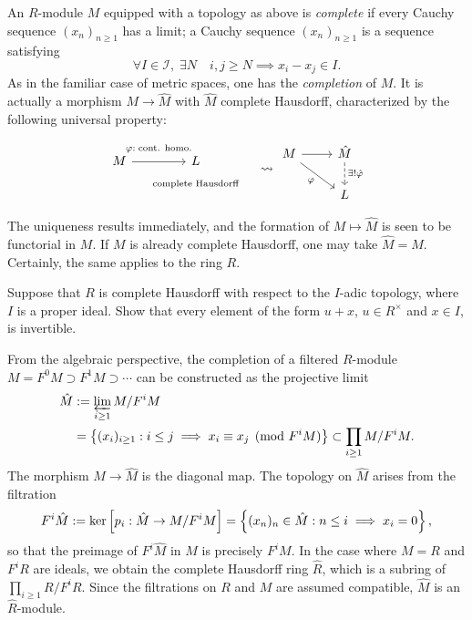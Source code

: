 An $R$-module $M$ equipped with a topology as above is \emph{complete} if every Cauchy sequence $(x_n)_{n \geq 1}$ has a limit; a Cauchy sequence $(x_n)_{n \geq 1}$ is a sequence satisfying
\[ \forall I \in \mathcal{I}, \; \exists N \quad i,j \geq N \implies x_i - x_j \in I. \]
As in the familiar case of metric spaces, one has the \emph{completion} of $M$. It is actually a morphism $M \to \hat{M}$ with $\hat{M}$ complete Hausdorff, characterized by the following universal property:
\[
\begin{tikzcd}[row sep=tiny, column sep=tiny]
	M \arrow[rr, "\varphi:\; \text{cont. homo.}" inner sep=0.7em] & & L \\
	& & \scriptsize\text{complete Hausdorff}
\end{tikzcd} \quad \leadsto
\begin{tikzcd}
	M \arrow[rd, "\varphi"'] \arrow[r] & \hat{M} \arrow[dashed, d, "\exists! \hat{\varphi}"] \\
	& L
\end{tikzcd}\]

The uniqueness results immediately, and the formation of $M \mapsto \hat{M}$ is seen to be functorial in $M$. If $M$ is already complete Hausdorff, one may take $\hat{M} = M$. Certainly, the same applies to the ring $R$.

\begin{exercise}
	Suppose that $R$ is complete Hausdorff with respect to the $I$-adic topology, where $I$ is a proper ideal. Show that every element of the form $u+x$, $u \in R^\times$ and $x \in I$, is invertible.
\end{exercise}

From the algebraic perspective, the completion of a filtered $R$-module $M = F^0 M \supset F^1 M \supset \cdots$ can be constructed as the projective limit
\begin{align*}
	\hat{M} & := \varprojlim_{i \geq 1} M/F^i M \\
	& = \left\{ (x_i)_{i \geq 1} : i \leq j \implies x_i \equiv x_j \pmod{F^i M} \right\} \subset \prod_{i \geq 1} M/F^i M.
\end{align*}
The morphism $M \to \hat{M}$ is the diagonal map. The topology on $\hat{M}$ arises from the filtration
\[ F^i \hat{M} := \operatorname{ker}\left[ p_i: \hat{M} \to M/F^i M \right] = \left\{ (x_n)_n \in \hat{M}: n \leq i \implies x_i=0 \right\}, \]
so that the preimage of $F^i \hat{M}$ in $M$ is precisely $F^i M$. In the case where $M=R$ and $F^i R$ are ideals, we obtain the complete Hausdorff ring $\hat{R}$, which is a subring of $\prod_{i \geq 1} R/F^i R$. Since the filtrations on $R$ and $M$ are assumed compatible, $\hat{M}$ is an $\hat{R}$-module.

